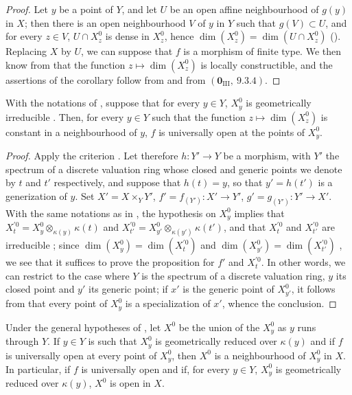 \begin{proof}
Let $y$ be a point of $Y$, and let $U$ be an open affine neighbourhood of $g(y)$ in $X$; then there is an open neighbourhood $V$ of $y$ in $Y$ such that $g(V)\subset U$, and for every $z\in V$, $U\cap X_z^0$ is dense in $X_z^0$, hence $\dim(X_z^0)=\dim(U\cap X_z^0)$ ().
Replacing $X$ by $U$, we can suppose that $f$ is a morphism of finite type.
We then know from  that the function $z\mapsto\dim(X_z^0)$ is locally constructible, and the assertions of the corollary follow from  and from $(\mathbf{0}_{\mathrm{III}},~9.3.4)$.
\end{proof}

\begin{proposition}[15.6.3]
\label{IV.15.6.3}
With the notations of , suppose that for every $y\in Y$, $X_y^0$ is geometrically irreducible .
Then, for every $y\in Y$ such that the function $z\mapsto\dim(X_z^0)$ is constant in a neighbourhood of $y$, $f$ is universally open at the points of $X_y^0$.
\end{proposition}

\begin{proof}
Apply the criterion .
Let therefore $h:Y'\to Y$ be a morphism, with $Y'$ the spectrum of a discrete valuation ring whose closed and generic points we denote by $t$ and $t'$ respectively, and suppose that $h(t)=y$, so that $y'=h(t')$ is a generization of $y$.
Set $X'=X\times_Y Y'$, $f'=f_{(Y')}:X'\to Y'$, $g'=g_{(Y')}:Y'\to X'$.
With the same notations as in , the hypothesis on $X_y^0$ implies that $X_t^{\prime 0}=X_y^0\otimes_{\kappa(y)}\kappa(t)$ and $X_{t'}^{\prime 0}=X_{y'}^0\otimes_{\kappa(y')}\kappa(t')$, and that $X_t^{\prime 0}$ and $X_{t'}^{\prime 0}$ are irreducible ; since $\dim(X_y^0)=\dim(X_t^{\prime 0})$ and $\dim(X_{y'}^0)=\dim(X_{t'}^{\prime 0})$ , we see that it suffices to prove the proposition for $f'$ and $X_t^{\prime 0}$. In other words, we can restrict to the case where $Y$ is the spectrum of a discrete valuation ring, $y$ its closed point and $y'$ its generic point; if $x'$ is the generic point of $X_{y'}^0$, it follows from  that every point of $X_y^0$ is a specialization of $x'$, whence the conclusion.
\end{proof}

\begin{proposition}[15.6.4]
\label{IV.15.6.4}
Under the general hypotheses of , let $X^0$ be the union of the $X_y^0$ as $y$ runs through $Y$.
If $y\in Y$ is such that $X_y^0$ is geometrically reduced over $\kappa(y)$  and if $f$ is universally open at every point of $X_y^0$, then $X^0$ is a neighbourhood of $X_y^0$ in $X$.
In particular, if $f$ is universally open and if, for every $y\in Y$, $X_y^0$ is geometrically reduced over $\kappa(y)$, $X^0$ is open in $X$.
\end{proposition}

